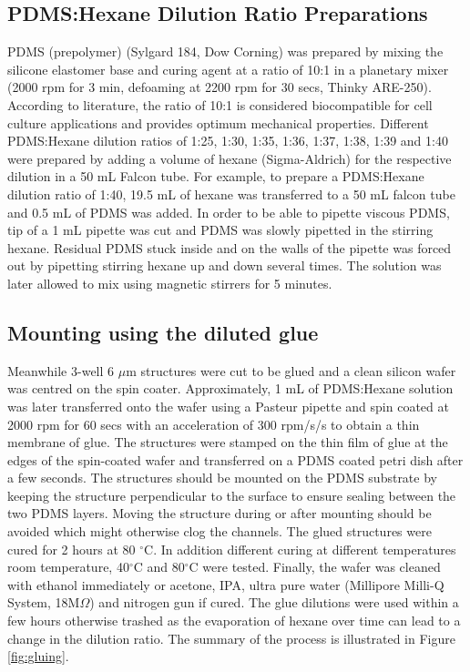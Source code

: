 \documentclass{book}
\begin{document}
\subsection{PDMS:Hexane Dilution Ratio Preparations}
PDMS (prepolymer) (Sylgard 184, Dow Corning) was prepared by mixing the silicone elastomer base and curing agent at a ratio of 10:1 in a planetary mixer (2000 rpm for 3 min, defoaming at 2200 rpm for 30 secs, Thinky ARE-250). According to literature, the ratio of 10:1 is considered biocompatible for cell culture applications and provides optimum mechanical properties. \cite{akther2020surface} Different PDMS:Hexane dilution ratios of 1:25, 1:30, 1:35, 1:36, 1:37, 1:38, 1:39 and 1:40 were prepared by adding a volume of hexane (Sigma-Aldrich) for the respective dilution in a 50 mL Falcon tube. For example, to prepare a PDMS:Hexane dilution ratio of 1:40, 19.5 mL of hexane was transferred to a 50 mL falcon tube and 0.5 mL of PDMS was added. In order to be able to pipette viscous PDMS, tip of a 1 mL pipette was cut and PDMS was slowly pipetted in the stirring hexane. Residual PDMS stuck inside and on the walls of the pipette was forced out by pipetting stirring hexane up and down several times. The solution was later allowed to mix using magnetic stirrers for 5 minutes. 

\subsection{Mounting using the diluted glue}
Meanwhile 3-well 6 $\mu$m structures were cut to be glued and a clean silicon wafer was centred on the spin coater. Approximately, 1 mL of PDMS:Hexane solution was later transferred onto the wafer using a Pasteur pipette and spin coated at 2000 rpm for 60 secs with an acceleration of 300 rpm/s/s to obtain a thin membrane of glue. The structures were stamped on the thin film of glue at the edges of the spin-coated wafer and transferred on a PDMS coated petri dish after a few seconds. The structures should be mounted on the PDMS substrate by keeping the structure perpendicular to the surface to ensure sealing between the two PDMS layers. Moving the structure during or after mounting should be avoided which might otherwise clog the channels. The glued structures were cured for 2 hours at 80 $^{\circ}$C. In addition different curing at different temperatures room temperature, 40$^{\circ}$C and 80$^{\circ}$C were tested. Finally, the wafer was cleaned with ethanol immediately or acetone, IPA, ultra pure water (Millipore Milli-Q System, 18M$\Omega$) and nitrogen gun if cured. The glue dilutions were used within a few hours otherwise trashed as the evaporation of hexane over time can lead to a change in the dilution ratio. The summary of the process is illustrated in Figure \ref{fig:gluing}.
\end{document}
